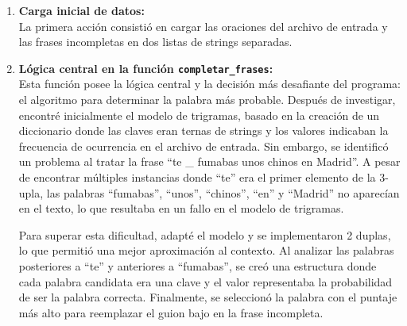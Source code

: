 \documentclass{article}
\begin{document}
\begin{enumerate}
    \item \textbf{Carga inicial de datos:} \\
    La primera acción consistió en cargar las oraciones del archivo de entrada y las frases incompletas en dos listas de strings separadas.
    
    \item \textbf{Lógica central en la función \texttt{completar\_frases}:} \\
    Esta función posee la lógica central y la decisión más desafiante del programa: el algoritmo para determinar la palabra más probable. Después de investigar, encontré inicialmente el modelo
     de trigramas, basado en la creación de un diccionario donde las claves eran ternas de strings y los valores indicaban la frecuencia de ocurrencia en el archivo de entrada. Sin embargo, se identificó un
      problema al tratar la frase ``te \_ fumabas unos chinos en Madrid''. A pesar de encontrar múltiples instancias donde ``te'' era el primer elemento de la 3-upla, las palabras ``fumabas'', ``unos'', ``chinos'', ``en'' y ``Madrid'' no aparecían en el texto, lo que resultaba en un fallo en el modelo de trigramas.
    
    Para superar esta dificultad, adapté el modelo y se implementaron 2 duplas, lo que permitió una mejor aproximación al contexto. Al analizar las palabras posteriores a ``te'' y anteriores a ``fumabas'', se creó una estructura donde cada palabra candidata era una clave y el valor representaba la probabilidad de ser la palabra correcta. Finalmente, se seleccionó la palabra con el puntaje más alto para reemplazar el guion bajo en la frase incompleta.
\end{enumerate}
\end{document}

